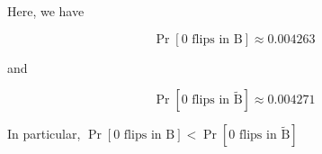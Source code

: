 \documentclass{article}
\theoremstyle{definition}
\begin{document}
Here, we have

$$\Pr[0\,\,\mathrm{flips\,\,in\,\, B}]\approx 0.004263$$

and

$$\Pr[0\,\,\mathrm{flips\,\,in\,\, \tilde{B}}]\approx 0.004271$$

In particular, $\Pr[0\,\,\mathrm{flips\,\,in\,\, B}]<\Pr[0\,\,\mathrm{flips\,\,in\,\, \tilde{B}}]$




\end{document}
